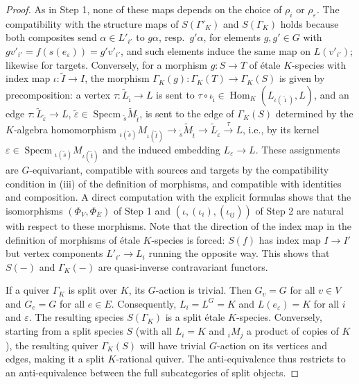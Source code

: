 \documentclass[a4paper,12pt,reqno]{amsart}
\DeclareMathOperator{\Specm}{\mathrm{Specm}}
\DeclareMathOperator{\Hom}{\mathrm{Hom}}
\theoremstyle{plain}
\theoremstyle{remark}
\begin{document}
\begin{proof}
    As in Step 1, none of these maps depends on the choice of $\rho_i$ or $\rho_\varepsilon$. The compatibility with the structure maps of $S(\Gamma'_K)$ and $S(\Gamma_K)$ holds because both composites send $\alpha\in L'_{i'}$ to $g\alpha$, resp.\ $g'\alpha$, for elements $g,g'\in G$ with $gv'_{i'}=f(s(e_\varepsilon))=g'v'_{i'}$, and such elements induce the same map on $L(v'_{i'})$; likewise for targets. Conversely, for a morphism $g\colon S\to T$ of \'etale $K$-species with index map $\iota\colon\widetilde{I}\to I$, the morphism $\Gamma_K(g)\colon\Gamma_K(T)\to\Gamma_K(S)$ is given by precomposition: a vertex $\tau\colon\widetilde{L}_{\widetilde{\imath}}\to L$ is sent to $\tau\circ\iota_{\widetilde{\imath}}\in\Hom_K(L_{\iota(\widetilde{\imath})},L)$, and an edge $\tau\colon\widetilde{L}_{\widetilde{\varepsilon}}\to L$, $\widetilde{\varepsilon}\in\Specm{}_{\widetilde{s}}\widetilde{M}_{\widetilde{t}}$, is sent to the edge of $\Gamma_K(S)$ determined by the $K$-algebra homomorphism ${}_{\iota(\widetilde{s})}M_{\iota(\widetilde{t})}\to{}_{\widetilde{s}}\widetilde{M}_{\widetilde{t}}\to\widetilde{L}_{\widetilde{\varepsilon}}\xrightarrow{\tau}L$, i.e., by its kernel $\varepsilon\in\Specm{}_{\iota(\widetilde{s})}M_{\iota(\widetilde{t})}$ and the induced embedding $L_\varepsilon\to L$. These assignments are $G$-equivariant, compatible with sources and targets by the compatibility condition in (iii) of the definition of morphisms, and compatible with identities and composition. A direct computation with the explicit formulas shows that the isomorphisms $(\Phi_V,\Phi_E)$ of Step 1 and $(\iota,(\iota_i),(\iota_{ij}))$ of Step 2 are natural with respect to these morphisms. Note that the direction of the index map in the definition of morphisms of \'etale $K$-species is forced: $S(f)$ has index map $I\to I'$ but vertex components $L'_{i'}\to L_i$ running the opposite way. This shows that $S(-)$ and $\Gamma_K(-)$ are quasi-inverse contravariant functors.
    
    If a quiver $\Gamma_K$ is split over $K$, its $G$-action is trivial. Then $G_v=G$ for all $v\in V$ and $G_e=G$ for all $e\in E$. Consequently, $L_i=L^G=K$ and $L(e_\varepsilon)=K$ for all $i$ and $\varepsilon$. The resulting species $S(\Gamma_K)$ is a split \'etale $K$-species. Conversely, starting from a split species $S$ (with all $L_i=K$ and ${}_iM_j$ a product of copies of $K$), the resulting quiver $\Gamma_K(S)$ will have trivial $G$-action on its vertices and edges, making it a split $K$-rational quiver. The anti-equivalence thus restricts to an anti-equivalence between the full subcategories of split objects.
  \end{proof}
\end{document}

